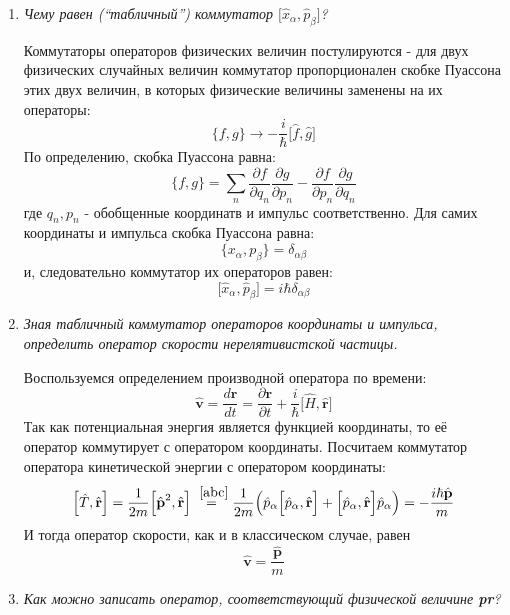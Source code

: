 \documentclass{article}
\begin{document}
\begin{enumerate}
	\item \textit{Чему равен (“табличный”) коммутатор $\big[\hat{x}_\alpha, \hat{p}_\beta \big]$?}
	
	Коммутаторы операторов физических величин постулируются - для двух физических случайных величин коммутатор пропорционален скобке Пуассона этих двух величин, в которых физические величины заменены на их операторы:
	\begin{equation}
		\Big\{ f, g \Big\} \rightarrow -\frac{i}{\hbar} \Big[\hat{f}, \hat{g}\Big]
	\end{equation}
	По определению, скобка Пуассона равна:
	\begin{equation}
		\Big\{ f, g \Big\} = \sum\limits_n \frac{\partial f}{\partial q_n} \frac{\partial g}{\partial p_n} - \frac{\partial f}{\partial p_n} \frac{\partial g}{\partial q_n}
	\end{equation}
	где $q_n, p_n$ - обобщенные координатв и импульс соответственно. Для самих координаты и импульса скобка Пуассона равна:
	\begin{equation}
		\Big\{ x_\alpha, p_\beta \Big\} = \delta_{\alpha \beta}
	\end{equation}
	и, следовательно коммутатор их операторов равен:
	\begin{equation}
		\big[\hat{x}_\alpha, \hat{p}_\beta \big] = i\hbar \delta_{\alpha\beta}
	\end{equation}
	
	\item \textit{Зная табличный коммутатор операторов координаты и импульса, определить оператор скорости нерелятивистской частицы.}
	
	Воспользуемся определением производной оператора по времени:
	\begin{equation}
		\hat{\textbf{v}} = \frac{d \textbf{r}}{dt} = \frac{\partial \textbf{r}}{\partial t} + \frac{i}{\hbar} \Big[ \hat{H}, \hat{\textbf{r}} \Big]
	\end{equation}
	Так как потенциальная энергия является функцией координаты, то её оператор коммутирует с оператором координаты. Посчитаем коммутатор оператора кинетической энергии с оператором координаты:
	\begin{equation}
		\Big[ \hat{T}, \hat{\textbf{r}} \Big] = \frac{1}{2m} \Big[ \hat{\textbf{p}}^2, \hat{\textbf{r}} \Big] \stackrel{~\eqref{abc}}{=} \frac{1}{2m} \Big(\hat{p}_\alpha \Big[\hat{p}_\alpha, \hat{\textbf{r}}\Big] + \Big[\hat{p}_\alpha, \hat{\textbf{r}}\Big]\hat{p}_\alpha \Big) = -\frac{i\hbar\hat{\textbf{p}}}{m}
	\end{equation}
	И тогда оператор скорости, как и в классическом случае, равен
	\begin{equation}
		\hat{\textbf{v}} = \frac{\hat{\textbf{p}}}{m}
	\end{equation}
	\item \textit{Как можно записать оператор, соответствующий физической величине \textbf{pr}?}
	

\end{enumerate}
\end{document}

